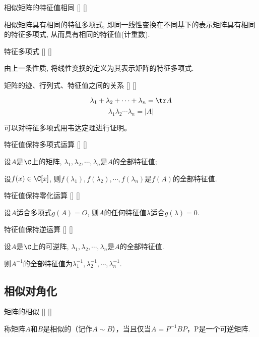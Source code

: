 \documentclass[UTF8]{ctexart}
\begin{document}
		\begin{ppt}
			[]
			{相似矩阵的特征值相同}
			[]
			[]

			相似矩阵具有相同的特征多项式, 即同一线性变换在不同基下的表示矩阵具有相同的特征多项式, 从而具有相同的特征值(计重数). 
		\end{ppt}
		
		\begin{dfn}
			[]
			{特征多项式}
			[]
			[]
			
			由上一条性质, 将线性变换的定义为其表示矩阵的特征多项式. 
		\end{dfn}
		
		\begin{ppt}
			[]
			{矩阵的迹、行列式、特征值之间的关系}
			[]
			[]

			\[\lambda_1+\lambda_2+\cdots+\lambda_n=\tr A\]
			\[\lambda_1\lambda_2\cdots\lambda_n=|A|\]
		\end{ppt}

		可以对特征多项式用韦达定理进行证明。
		
		\begin{ppt}
			[]
			{特征值保持多项式运算}
			[]
			[]

			设$A$是$\C$上的矩阵, $\lambda_1,\lambda_2,\cdots,\lambda_n$是$A$的全部特征值; 
			
			设$f(x)\in\C[x]$, 则$f(\lambda_1),f(\lambda_2),\cdots,f(\lambda_n)$是$f(A)$的全部特征值. 
		\end{ppt}

		\begin{ppt}
			[]
			{特征值保持零化运算}
			[]
			[]

			设$A$适合多项式$g(A)=O$, 则$A$的任何特征值$\lambda$适合$g(\lambda)=0$. 
		\end{ppt}
		
		\begin{ppt}
			[]
			{特征值保持逆运算}
			[]
			[]

			设$A$是$\C$上的可逆阵, $\lambda_1,\lambda_2,\cdots,\lambda_n$是$A$的全部特征值. 
			
			则$A^{-1}$的全部特征值为$\lambda_1^{-1},\lambda_2^{-1},\cdots,\lambda_n^{-1}$. 
		\end{ppt}

		
	\subsection{相似对角化}

		\begin{dfn}
			[]
			{矩阵的相似}
			[]
			[]

			称矩阵$A$和$B$是相似的（记作$A\sim B$），当且仅当$A=P^{-1}BP$，P是一个可逆矩阵.
		\end{dfn}
\end{document}
